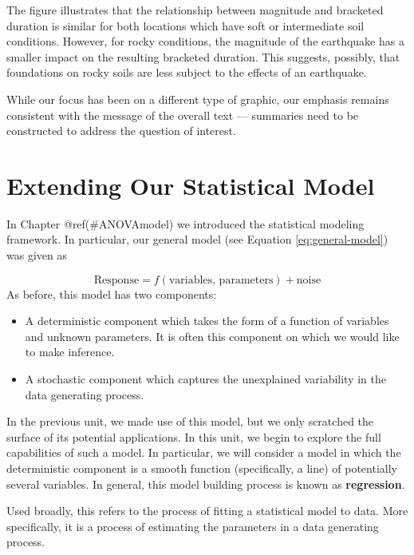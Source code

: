 \documentclass[]{book}
\providecommand{\tightlist}{%
  \setlength{\itemsep}{0pt}\setlength{\parskip}{0pt}}
\theoremstyle{definition}
\theoremstyle{definition}
\theoremstyle{definition}
\theoremstyle{remark}
\let\BeginKnitrBlock\begin \let\EndKnitrBlock\end
\begin{document}
The figure illustrates that the relationship between magnitude and
bracketed duration is similar for both locations which have soft or
intermediate soil conditions. However, for rocky conditions, the
magnitude of the earthquake has a smaller impact on the resulting
bracketed duration. This suggests, possibly, that foundations on rocky
soils are less subject to the effects of an earthquake.

While our focus has been on a different type of graphic, our emphasis
remains consistent with the message of the overall text --- summaries
need to be constructed to address the question of interest.

\chapter{Extending Our Statistical Model}\label{Regmodel}

In Chapter @ref(\#ANOVAmodel) we introduced the statistical modeling
framework. In particular, our general model (see Equation
\eqref{eq:general-model}) was given as

\[\text{Response} = f(\text{variables, parameters}) + \text{noise}\] As
before, this model has two components:

\begin{itemize}
\tightlist
\item
  A deterministic component which takes the form of a function of
  variables and unknown parameters. It is often this component on which
  we would like to make inference.
\item
  A stochastic component which captures the unexplained variability in
  the data generating process.
\end{itemize}

In the previous unit, we made use of this model, but we only scratched
the surface of its potential applications. In this unit, we begin to
explore the full capabilities of such a model. In particular, we will
consider a model in which the deterministic component is a smooth
function (specifically, a line) of potentially several variables. In
general, this model building process is known as \textbf{regression}.

\BeginKnitrBlock{definition}[Regression]
\protect\hypertarget{def:defn-regression}{}{\label{def:defn-regression}
{} }Used broadly, this refers to the process of
fitting a statistical model to data. More specifically, it is a process
of estimating the parameters in a data generating process.
\EndKnitrBlock{definition}
\end{document}
